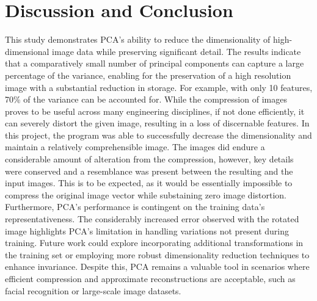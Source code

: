 \documentclass[conference]{IEEEtran}
\begin{document}
\section{Discussion and Conclusion}
This study demonstrates PCA's ability to reduce the dimensionality of high-dimensional image data while preserving significant detail. The results indicate that a comparatively small number of principal components can capture a large percentage of the variance, enabling for the preservation of a high resolution image with a substantial reduction in storage. For example, with only 10 features, 70\% of the variance can be accounted for. While the compression of images proves to be useful across many engineering disciplines, if not done efficiently, it can severely distort the given image, resulting in a loss of discernable features. In this project, the program was able to successfully decrease the dimensionality and maintain a relatively comprehensible image. The images did endure a considerable amount of alteration from the compression, however, key details were conserved and a resemblance was present between the resulting and the input images. This is to be expected, as it would be essentially impossible to compress the original image vector while substaining zero image distortion. Furthermore, PCA's performance is contingent on the training data's representativeness. The considerably increased error observed with the rotated image highlights PCA's limitation in handling variations not present during training. Future work could explore incorporating additional transformations in the training set or employing more robust dimensionality reduction techniques to enhance invariance. Despite this, PCA remains a valuable tool in scenarios where efficient compression and approximate reconstructions are acceptable, such as facial recognition or large-scale image datasets.

%
%
%
%
%
\end{document}
